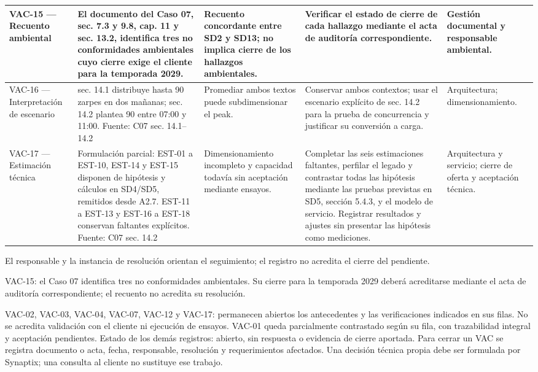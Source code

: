 \begin{longtable}{|L{0.116466\AnchoTablaAnexo}|L{0.297189\AnchoTablaAnexo}|L{0.168675\AnchoTablaAnexo}|L{0.281124\AnchoTablaAnexo}|L{0.136546\AnchoTablaAnexo}|}
VAC-15 — Recuento ambiental & El documento del Caso 07, sec. 7.3 y 9.8, cap. 11 y sec. 13.2, identifica tres no conformidades ambientales cuyo cierre exige el cliente para la temporada 2029. & Recuento concordante entre SD2 y SD13; no implica cierre de los hallazgos ambientales. & Verificar el estado de cierre de cada hallazgo mediante el acta de auditoría correspondiente. & Gestión documental y responsable ambiental. \\ \hline
VAC-16 — Interpretación de escenario & sec. 14.1 distribuye hasta 90 zarpes en dos mañanas; sec. 14.2 plantea 90 entre 07:00 y 11:00. Fuente: C07 sec. 14.1–14.2 & Promediar ambos textos puede subdimensionar el peak. & Conservar ambos contextos; usar el escenario explícito de sec. 14.2 para la prueba de concurrencia y justificar su conversión a carga. & Arquitectura; dimensionamiento. \\ \hline
{}
VAC-17 — Estimación técnica & Formulación parcial: EST-01 a EST-10, EST-14 y EST-15 disponen de hipótesis y cálculos en SD4/SD5, remitidos desde A2.7. EST-11 a EST-13 y EST-16 a EST-18 conservan faltantes explícitos. Fuente: C07 sec. 14.2 & Dimensionamiento incompleto y capacidad todavía sin aceptación mediante ensayos. & Completar las seis estimaciones faltantes, perfilar el legado y contrastar todas las hipótesis mediante las pruebas previstas en SD5, sección 5.4.3, y el modelo de servicio. Registrar resultados y ajustes sin presentar las hipótesis como mediciones. & Arquitectura y servicio; cierre de oferta y aceptación técnica. \\ \hline
\end{longtable}

El responsable y la instancia de resolución orientan el seguimiento; el registro no acredita el cierre del pendiente.

VAC-15: el Caso 07 identifica tres no conformidades ambientales. Su cierre para la temporada 2029 deberá acreditarse mediante el acta de auditoría correspondiente; el recuento no acredita su resolución.

VAC-02, VAC-03, VAC-04, VAC-07, VAC-12 y VAC-17: permanecen abiertos los antecedentes y las verificaciones indicados en sus filas. No se acredita validación con el cliente ni ejecución de ensayos. VAC-01 queda parcialmente contrastado según su fila, con trazabilidad integral y aceptación pendientes. Estado de los demás registros: abierto, sin respuesta o evidencia de cierre aportada. Para cerrar un VAC se registra documento o acta, fecha, responsable, resolución y requerimientos afectados. Una decisión técnica propia debe ser formulada por Synaptix; una consulta al cliente no sustituye ese trabajo.
